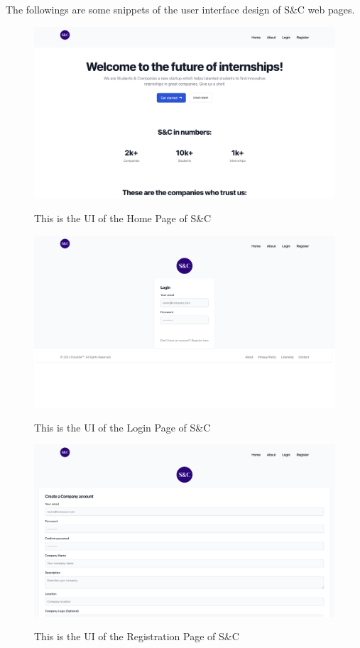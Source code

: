 The followings are some snippets of the user interface design of S\&C web pages.

\begin{figure}[h!]
        \centering  \includegraphics[width=1\textwidth]{DD/Images/userInterfaces/LandingPage.png}
        \label{fig:LandingPage}
        \caption{This is the UI of the Home Page of S\&C }
\end{figure}

\begin{figure}[h!]
        \centering  \includegraphics[width=1\textwidth]{DD/Images/userInterfaces/LoginPage.png}
        \label{fig:LoginPage}
        \caption{This is the UI of the Login Page of S\&C }

\end{figure}

\begin{figure}[h!]
        \centering  \includegraphics[width=1\textwidth]{DD/Images/userInterfaces/CompanyRegistrationPage.png}
        \label{fig:RegistrationPage}
        \caption{This is the UI of the Registration Page of S\&C }
\end{figure}
